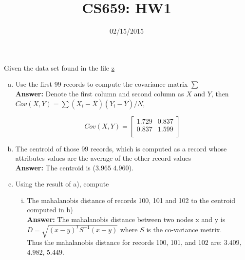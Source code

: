 \documentclass[11pt, final]{article}
\begin{document}
\title{CS659: HW1}



\date{02/15/2015}

\maketitle

\paragraph{} Given the data set found in the file \href{http://cs.gmu.edu/~dbarbara/CS659/z.txt}{z}

\begin{enumerate}[(a)]
\item Use the first 99 records to compute the covariance matrix $\sum$ \\

\textbf{Answer:} Denote the first column and second column as $X$ and $Y$, then $Cov(X,Y) = \sum (X_i - \bar{X}) (Y_i - \bar{Y}) /N$, 

\begin{displaymath}
Cov(X,Y) = 
\begin{bmatrix}
    1.729 &  0.837 \\
    0.837 &  1.599 \\
\end{bmatrix}
\end{displaymath}



 
\item The centroid of those 99 records, which is computed as a record whose attributes values are the average of the other record values\\

\textbf{Answer:} The centroid is ($3.965$
$4.960$).
\item Using the result of a), compute
\begin{enumerate}[(i)]
\item The mahalanobis distance of records 100, 101 and 102 to the centroid computed in b)\\

\textbf{Answer:} The mahalanobis distance between two nodes x and y is $D = \sqrt{(x-y)^T S^{-1} (x-y)}$ where $S$ is the co-variance metrix. \\
Thus the mahalanobis distance for records 100, 101, and 102 are: $3.409$, $ 4.982$, $5.449$. 


\end{enumerate}
\end{enumerate}
\end{document}
